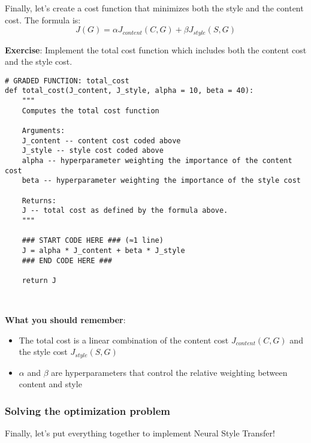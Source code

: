 {
Finally, let's create a cost function that minimizes both the style and the content cost. The formula is: 
\begin{equation}
J(G) = \alpha J_{content}(C,G) + \beta J_{style}(S,G)
\end{equation}

{\textbf{Exercise}}: Implement the total cost function which includes both the content cost and the style cost. 
\begin{verbatim}
# GRADED FUNCTION: total_cost
def total_cost(J_content, J_style, alpha = 10, beta = 40):
    """
    Computes the total cost function
    
    Arguments:
    J_content -- content cost coded above
    J_style -- style cost coded above
    alpha -- hyperparameter weighting the importance of the content cost
    beta -- hyperparameter weighting the importance of the style cost
    
    Returns:
    J -- total cost as defined by the formula above.
    """
    
    ### START CODE HERE ### (≈1 line)
    J = alpha * J_content + beta * J_style
    ### END CODE HERE ###
    
    return J
\end{verbatim}
\\
{\color{red}\textbf{What you should remember}:
\begin{itemize}
\item The total cost is a linear combination of the content cost $J_{content}(C,G)$ and the style cost $J_{style}(S,G)$
\item $\alpha$ and $\beta$ are hyperparameters that control the relative weighting between content and style
\end{itemize}
}




\subsubsection{Solving the optimization problem}

Finally, let's put everything together to implement Neural Style Transfer!


}
